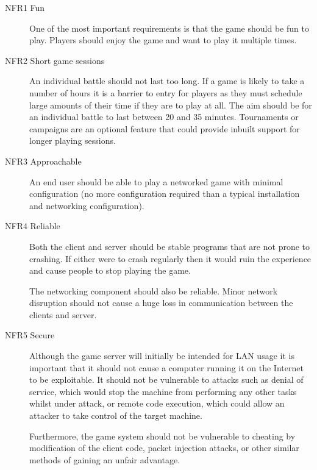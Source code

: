 \begin{description}

	\item[NFR1 Fun] One of the most important requirements is that the game should be fun to play. Players should enjoy the game and want to play it multiple times.

	\item[NFR2 Short game sessions] An individual battle should not last too long. If a game is likely to take a number of hours it is a barrier to entry for players as they must schedule large amounts of their time if they are to play at all. The aim should be for an individual battle to last between 20 and 35 minutes. Tournaments or campaigns are an optional feature that could provide inbuilt support for longer playing sessions.
	
	\item[NFR3 Approachable]  An end user should be able to play a networked game with minimal configuration (no more configuration required than a typical installation and networking configuration).

	\item[NFR4 Reliable] Both the client and server should be stable programs that are not prone to crashing. If either were to crash regularly then it would ruin the experience and cause people to stop playing the game.

	The networking component should also be reliable. Minor network disruption should not cause a huge loss in communication between the clients and server.

	\item[NFR5 Secure] Although the game server will initially be intended for LAN usage it is important that it should not cause a computer running it on the Internet to be exploitable. It should not be vulnerable to attacks such as denial of service, which would stop the machine from performing any other tasks whilst under attack, or remote code execution, which could allow an attacker to take control of the target machine. 
	
	Furthermore, the game system should not be vulnerable to cheating by modification of the client code, packet injection attacks, or other similar methods of gaining an unfair advantage. 


\end{description}

